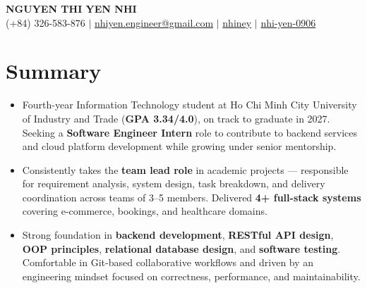 \documentclass[letterpaper,11pt]{article}
\newcommand{\resumeItem}[1]{
  \item\small{
    {#1 \vspace{-2pt}}
  }
}
\newcommand{\resumeSubHeadingListStart}{\begin{itemize}[leftmargin=0.15in, label={}]}
\newcommand{\resumeSubHeadingListEnd}{\end{itemize}}
\begin{document}
\begin{center}
    \textbf{\Huge \scshape NGUYEN THI YEN NHI} \\ \vspace{4pt}
    \small
     (+84) 326-583-876 $|$
    \href{mailto:nhiyen.engineer@gmail.com}{ nhiyen.engineer@gmail.com} $|$
    \href{https://github.com/nguyenlephong}{ nhiney} $|$
    \href{https://www.linkedin.com/in/nhi-yen-410b2a2b7/}{ nhi-yen-0906}
\end{center}

\section{Summary}
  \resumeSubHeadingListStart
    \resumeItem{
      Fourth-year Information Technology student at Ho Chi Minh City University of Industry and Trade (\textbf{GPA 3.34/4.0}), on track to graduate in 2027. Seeking a \textbf{Software Engineer Intern} role to contribute to backend services and cloud platform development while growing under senior mentorship.
    }
    \resumeItem{
      Consistently takes the \textbf{team lead role} in academic projects — responsible for requirement analysis, system design, task breakdown, and delivery coordination across teams of 3--5 members. Delivered \textbf{4+ full-stack systems} covering e-commerce, bookings, and healthcare domains.
    }
    \resumeItem{
      Strong foundation in \textbf{backend development}, \textbf{RESTful API design}, \textbf{OOP principles}, \textbf{relational database design}, and \textbf{software testing}. Comfortable in Git-based collaborative workflows and driven by an engineering mindset focused on correctness, performance, and maintainability.
    }
  \resumeSubHeadingListEnd

\vspace{4pt}

\end{document}
